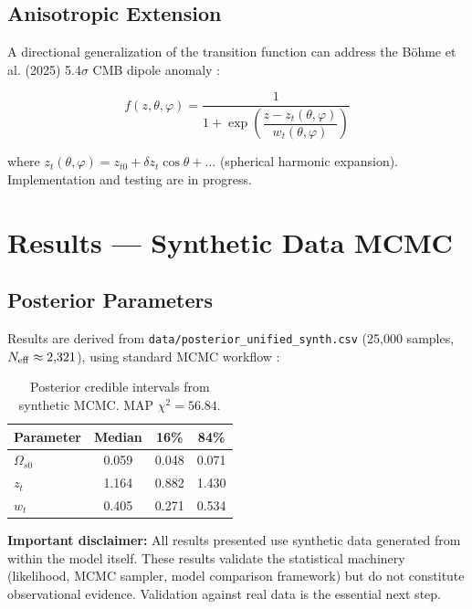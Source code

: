 \documentclass[11pt,a4paper]{article}
\begin{document}
\subsection{Anisotropic Extension}

A directional generalization of the transition function can address the Böhme et al. (2025) 5.4$\sigma$ CMB dipole anomaly \cite{bohme2025}:

\begin{equation}
f(z,\theta,\varphi) = \frac{1}{1 + \exp\!\left(\dfrac{z - z_t(\theta,\varphi)}{w_t(\theta,\varphi)}\right)}
\label{eq:fzang}
\end{equation}

\noindent where $z_t(\theta,\varphi) = z_{t0} + \delta z_t\cos\theta + \ldots$ (spherical harmonic expansion). Implementation and testing are in progress.

\section{Results — Synthetic Data MCMC}

\subsection{Posterior Parameters}

Results are derived from \texttt{data/posterior\_unified\_synth.csv} (25{,}000 samples, $N_{\rm eff} \approx 2{,}321$), using standard MCMC workflow \cite{lewis2002}:

\begin{table}[h]
\centering
\begin{tabular}{lccc}
\toprule
Parameter & Median & 16\% & 84\% \\
\midrule
$\Omega_{s0}$ & 0.059 & 0.048 & 0.071 \\
$z_t$         & 1.164 & 0.882 & 1.430 \\
$w_t$         & 0.405 & 0.271 & 0.534 \\
\bottomrule
\end{tabular}
\caption{Posterior credible intervals from synthetic MCMC. MAP $\chi^2 = 56.84$.}
\label{tab:posterior}
\end{table}

\noindent\textbf{Important disclaimer:} All results presented use synthetic data generated from within the model itself. These results validate the statistical machinery (likelihood, MCMC sampler, model comparison framework) but do not constitute observational evidence. Validation against real data is the essential next step.
\end{document}
